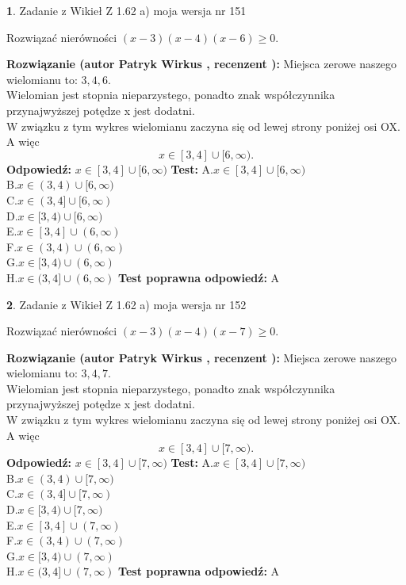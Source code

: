 \documentclass[12pt, a4paper]{article}
\theoremstyle{definition} %
\newtheorem{zad}{}
\newcommand{\zadStart}[1]{\begin{zad}#1\newline}
\newcommand{\zadStop}{\end{zad}}
\newcommand{\rozwStart}[2]{\noindent \textbf{Rozwiązanie (autor #1 , recenzent #2): }\newline}
\newcommand{\rozwStop}{\newline}
\newcommand{\odpStart}{\noindent \textbf{Odpowiedź:}\newline}
\newcommand{\odpStop}{\newline}
\newcommand{\testStart}{\noindent \textbf{Test:}\newline}
\newcommand{\testStop}{\newline}
\newcommand{\kluczStart}{\noindent \textbf{Test poprawna odpowiedź:}\newline}
\newcommand{\kluczStop}{\newline}
\begin{document}
\zadStart{Zadanie z Wikieł Z 1.62 a) moja wersja nr 151}

Rozwiązać nierówności $(x-3)(x-4)(x-6)\ge0$.
\zadStop
\rozwStart{Patryk Wirkus}{}
Miejsca zerowe naszego wielomianu to: $3, 4, 6$.\\
Wielomian jest stopnia nieparzystego, ponadto znak współczynnika przy\linebreak najwyższej potędze x jest dodatni.\\ W związku z tym wykres wielomianu zaczyna się od lewej strony poniżej osi OX. A więc $$x \in [3,4] \cup [6,\infty).$$
\rozwStop
\odpStart
$x \in [3,4] \cup [6,\infty)$
\odpStop
\testStart
A.$x \in [3,4] \cup [6,\infty)$\\
B.$x \in (3,4) \cup [6,\infty)$\\
C.$x \in (3,4] \cup [6,\infty)$\\
D.$x \in [3,4) \cup [6,\infty)$\\
E.$x \in [3,4] \cup (6,\infty)$\\
F.$x \in (3,4) \cup (6,\infty)$\\
G.$x \in [3,4) \cup (6,\infty)$\\
H.$x \in (3,4] \cup (6,\infty)$
\testStop
\kluczStart
A
\kluczStop



\zadStart{Zadanie z Wikieł Z 1.62 a) moja wersja nr 152}

Rozwiązać nierówności $(x-3)(x-4)(x-7)\ge0$.
\zadStop
\rozwStart{Patryk Wirkus}{}
Miejsca zerowe naszego wielomianu to: $3, 4, 7$.\\
Wielomian jest stopnia nieparzystego, ponadto znak współczynnika przy\linebreak najwyższej potędze x jest dodatni.\\ W związku z tym wykres wielomianu zaczyna się od lewej strony poniżej osi OX. A więc $$x \in [3,4] \cup [7,\infty).$$
\rozwStop
\odpStart
$x \in [3,4] \cup [7,\infty)$
\odpStop
\testStart
A.$x \in [3,4] \cup [7,\infty)$\\
B.$x \in (3,4) \cup [7,\infty)$\\
C.$x \in (3,4] \cup [7,\infty)$\\
D.$x \in [3,4) \cup [7,\infty)$\\
E.$x \in [3,4] \cup (7,\infty)$\\
F.$x \in (3,4) \cup (7,\infty)$\\
G.$x \in [3,4) \cup (7,\infty)$\\
H.$x \in (3,4] \cup (7,\infty)$
\testStop
\kluczStart
A
\kluczStop
\end{document}
